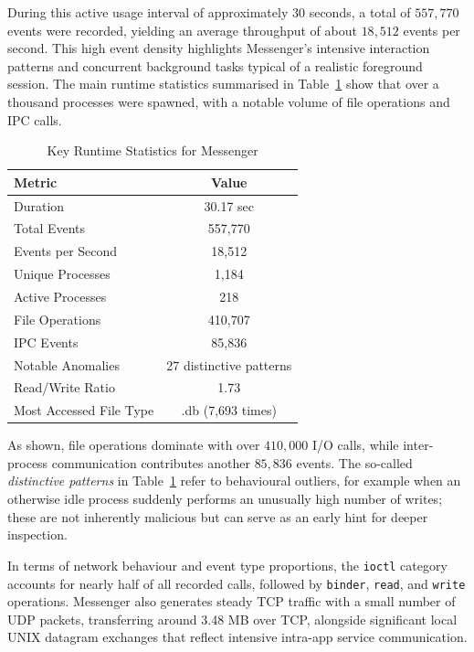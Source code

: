 \documentclass[a4paper,12pt]{report}
\begin{document}
During this active usage interval of approximately $30$ seconds, a total of $557,770$ events were recorded, yielding an average throughput of about $18,512$ events per second. This high event density highlights Messenger’s intensive interaction patterns and concurrent background tasks typical of a realistic foreground session. The main runtime statistics summarised in Table~\ref{tab:messenger_key_stats} show that over a thousand processes were spawned, with a notable volume of file operations and IPC calls.

\begin{table}[H]
    \centering
    \caption{Key Runtime Statistics for Messenger}
    \label{tab:messenger_key_stats}
    \begin{tabular}{|l|c|}
        \hline
        \textbf{Metric} & \textbf{Value} \\
        \hline
        Duration & 30.17 sec \\
        Total Events & 557,770 \\
        Events per Second & 18,512 \\
        Unique Processes & 1,184 \\
        Active Processes & 218 \\
        File Operations & 410,707 \\
        IPC Events & 85,836 \\
        Notable Anomalies & 27 distinctive patterns \\
        Read/Write Ratio & 1.73 \\
        Most Accessed File Type & .db (7,693 times) \\
        \hline
    \end{tabular}
\end{table}

As shown, file operations dominate with over $410,000$ I/O calls, while inter-process communication contributes another $85,836$ events. The so-called \textit{distinctive patterns} in Table~\ref{tab:messenger_key_stats} refer to behavioural outliers, for example when an otherwise idle process suddenly performs an unusually high number of writes; these are not inherently malicious but can serve as an early hint for deeper inspection.

In terms of network behaviour and event type proportions, the \texttt{ioctl} category accounts for nearly half of all recorded calls, followed by \texttt{binder}, \texttt{read}, and \texttt{write} operations. Messenger also generates steady TCP traffic with a small number of UDP packets, transferring around 3.48 MB over TCP, alongside significant local UNIX datagram exchanges that reflect intensive intra-app service communication.
\end{document}
